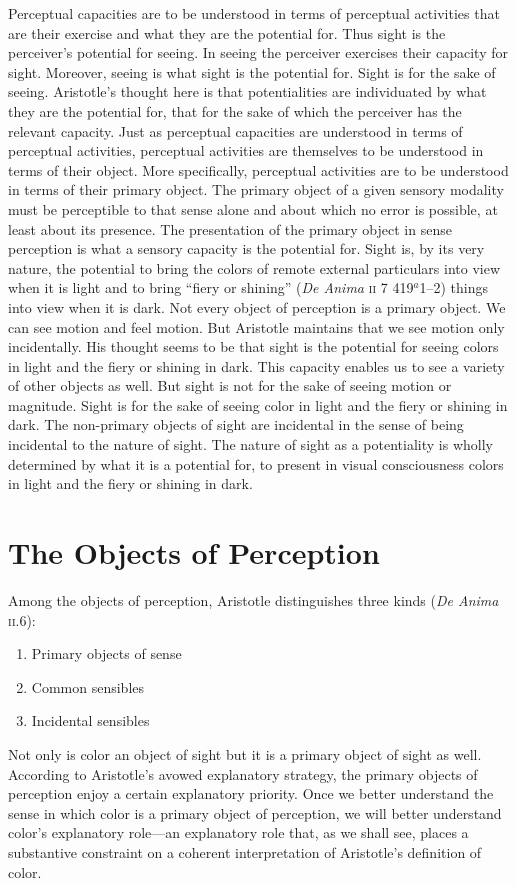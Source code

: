 Perceptual capacities are to be understood in terms of perceptual activities that are their exercise and what they are the potential for. Thus sight is the perceiver's potential for seeing. In seeing the perceiver exercises their capacity for sight. Moreover, seeing is what sight is the potential for. Sight is for the sake of seeing. Aristotle's thought here is that potentialities are individuated by what they are the potential for, that for the sake of which the perceiver has the relevant capacity. Just as perceptual capacities are understood in terms of perceptual activities, perceptual activities are themselves to be understood in terms of their object. More specifically, perceptual activities are to be understood in terms of their primary object. The primary object of a given sensory modality must be perceptible to that sense alone and about which no error is possible, at least about its presence. The presentation of the primary object in sense perception is what a sensory capacity is the potential for. Sight is, by its very nature, the potential to bring the colors of remote external particulars into view when it is light and to bring ``fiery or shining'' (\emph{De Anima} \textsc{ii} 7 419\( ^{a} \)1--2) things into view when it is dark. Not every object of perception is a primary object. We can see motion and feel motion. But Aristotle maintains that we see motion only incidentally. His thought seems to be that sight is the potential for seeing colors in light and the fiery or shining in dark. This capacity enables us to see a variety of other objects as well. But sight is not for the sake of seeing motion or magnitude. Sight is for the sake of seeing color in light and the fiery or shining in dark. The non-primary objects of sight are incidental in the sense of being incidental to the nature of sight. The nature of sight as a potentiality is wholly determined by what it is a potential for, to present in visual consciousness colors in light and the fiery or shining in dark.


\section{The Objects of Perception} %
\label{sec:the_objects_of_perception}

Among the objects of perception, Aristotle distinguishes three kinds (\emph{De Anima} \textsc{ii}.6):
\begin{enumerate}[(1)]
	\item Primary objects of sense
	\item Common sensibles
	\item Incidental sensibles
\end{enumerate}
Not only is color an object of sight but it is a primary object of sight as well. According to Aristotle's avowed explanatory strategy, the primary objects of perception enjoy a certain explanatory priority. Once we better understand the sense in which color is a primary object of perception, we will better understand color's explanatory role---an explanatory role that, as we shall see, places a substantive constraint on a coherent interpretation of Aristotle's definition of color.

